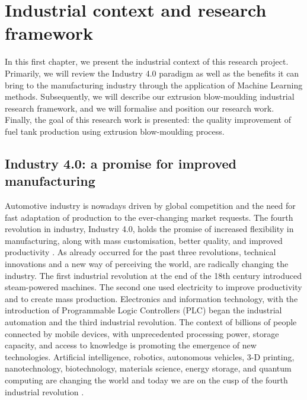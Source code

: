 \chapter{Industrial context and research framework} \label{Industrial Context and Research Framework}
\minitoc

In this first chapter, we present the industrial context of this research project. Primarily, we will review the Industry 4.0 paradigm as well as the benefits it can bring to the manufacturing industry through the application of Machine Learning methods. Subsequently, we will describe our extrusion blow-moulding industrial research framework, and we will formalise and position our research work. Finally, the goal of this research work is presented: the quality improvement of fuel tank production using extrusion blow-moulding process.  

\section{Industry 4.0: a promise for improved manufacturing}

Automotive industry is nowadays driven by global competition and the need for fast adaptation of production to the ever-changing market requests. The fourth revolution in industry, Industry 4.0, holds the promise of increased flexibility in manufacturing, along with mass customisation, better quality, and improved productivity \citep{zhong2017intelligent}. As already occurred for the past three revolutions, technical innovations and a new way of perceiving the world, are radically changing the industry. The first industrial revolution at the end of the 18th century introduced steam-powered machines. The second one used electricity to improve productivity and to create mass production. Electronics and information technology, with the introduction of Programmable Logic Controllers (PLC) began the industrial automation and the third industrial revolution. The context of billions of people connected by mobile devices, with unprecedented processing power, storage capacity, and access to knowledge is promoting the emergence of new technologies. Artificial intelligence, robotics, autonomous vehicles, 3-D printing, nanotechnology, biotechnology, materials science, energy storage, and quantum computing are changing the world and today we are on the cusp of the fourth industrial revolution \citep{schwab20164th}.  

